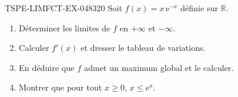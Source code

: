\begin{exercice}{TSPE-LIMFCT-EX-048}{3}{20}
Soit $f(x) = x\,\mathrm{e}^{-x}$ définie sur $\mathbb{R}$.
\begin{enumerate}
  \item Déterminer les limites de $f$ en $+\infty$ et $-\infty$.
  \item Calculer $f'(x)$ et dresser le tableau de variations.
  \item En déduire que $f$ admet un maximum global et le calculer.
  \item Montrer que pour tout $x \geq 0$, $x \leq \mathrm{e}^x$.
\end{enumerate}
\end{exercice}
